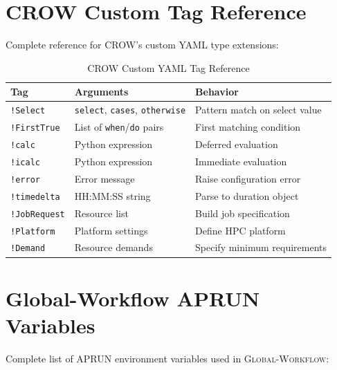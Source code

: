 \documentclass[11pt,twoside]{article}
\newcommand{\crow}{\textsc{CROW}}
\newcommand{\gw}{\textsc{Global-Workflow}}
\begin{document}
\appendix

\section{CROW Custom Tag Reference}
\label{app:crow-tags}

Complete reference for \crow{}'s custom YAML type extensions:

\begin{table}[H]
\centering
\caption{\crow{} Custom YAML Tag Reference}
\begin{tabular}{@{}llp{6cm}@{}}
\toprule
\textbf{Tag} & \textbf{Arguments} & \textbf{Behavior} \\
\midrule
\texttt{!Select} & \texttt{select}, \texttt{cases}, \texttt{otherwise} & Pattern match on select value \\
\texttt{!FirstTrue} & List of \texttt{when}/\texttt{do} pairs & First matching condition \\
\texttt{!calc} & Python expression & Deferred evaluation \\
\texttt{!icalc} & Python expression & Immediate evaluation \\
\texttt{!error} & Error message & Raise configuration error \\
\texttt{!timedelta} & HH:MM:SS string & Parse to duration object \\
\texttt{!JobRequest} & Resource list & Build job specification \\
\texttt{!Platform} & Platform settings & Define HPC platform \\
\texttt{!Demand} & Resource demands & Specify minimum requirements \\
\bottomrule
\end{tabular}
\end{table}

\newpage
\section{Global-Workflow APRUN Variables}
\label{app:aprun}

Complete list of APRUN environment variables used in \gw{}:
\end{document}
